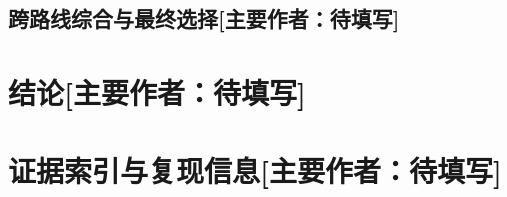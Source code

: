 \documentclass[UTF8,11pt,a4paper,fontset=none]{ctexart}
\newcommand{\primaryauthor}[1]{\texorpdfstring{\enspace\normalfont\small[主要作者：#1]}{ [主要作者：#1]}}
\newcommand{\authorsection}[2]{\section{#1\primaryauthor{#2}}}
\newcommand{\authorsubsection}[2]{\subsection{#1\primaryauthor{#2}}}
\newcommand{\pendingauthor}{待填写}
\newif\ifdraftguidance
\newcommand{\writingnote}[1]{%
  \ifdraftguidance
    \par\noindent\begingroup\color{promptblue}\small
    \fbox{\begin{minipage}{0.94\linewidth}\textbf{写作提示：}#1\end{minipage}}%
    \par\endgroup
  \fi
}
\newcommand{\todoitem}[1]{%
  \ifdraftguidance\textcolor{promptblue}{\textbf{[待补：#1]}}\fi
}
\begin{document}
\authorsubsection{跨路线综合与最终选择}{\pendingauthor}
\writingnote{按统一七步叙事写作。用表格总结三条路线的原始问题、方案、证据、结论和决策；不建立跨协议统一排行榜；将 B33 的 1,000-world benchmark 与 Die Hardest 的六局 package equivalence 分开；最终选择依据为完整 Task 1--4 谱系、4.231 历史均分、50.2\% 含并列第一、94.7\% survival 和可复现打包；明确 world 27155、Docker/官方硬件未验证以及该选择不是普遍最优证明。}
\todoitem{正文与 Table 4：三条路线问题—解决—结论综合}

\authorsection{结论}{\pendingauthor}
\writingnote{总结：多种价值学习器可完成 Task 1，但迁移深度不同；历史/reward 改变停滞，mask 减少自杀，二者都不自动解决长期规划；Task 3 得分改善，而 Task 4 增量方案缺少稳定收益；B33 是证据完整性与工程约束下的最终选择。不得引入正文未报告的新实验。}
\todoitem{正文}




\appendix
\authorsection{证据索引与复现信息}{\pendingauthor}
\writingnote{仅放置正文容纳不下的证据索引和复现信息；附录不得替代正文中的核心方法、实验结果与最终选择依据。}
\todoitem{补充内容}
\end{document}
